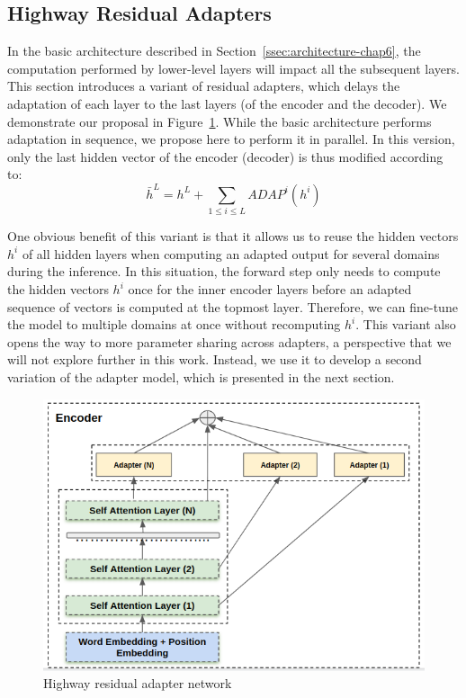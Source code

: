 \subsection{Highway Residual Adapters \label{ssec:highway-chap6}}

In the basic architecture described in Section~\ref{ssec:architecture-chap6}, the computation performed by lower-level layers will impact all the subsequent layers. This section introduces a variant of residual adapters, which delays the adaptation of each layer to the last layers (of the encoder and the decoder). We demonstrate our proposal in Figure~\ref{fig:hrl-architecture-chap6}. While the basic architecture performs adaptation in sequence, we propose here to perform it in parallel. In this version, only the last hidden vector of the encoder (decoder) is thus modified according to:
\begin{equation}
  \bar{h}^L = h^L + \displaystyle{\mathop{\sum}_{1 \leq i \leq L} ADAP^i(h^i)} \label{eq:highway-output-chap6}
\end{equation}

One obvious benefit of this variant is that it allows us to reuse the hidden vectors $h^i$ of all hidden layers when computing an adapted output for several domains during the inference. In this situation, the forward step only needs to compute the hidden vectors $h^i$ once for the inner encoder layers before an adapted sequence of vectors is computed at the topmost layer. Therefore, we can fine-tune the model to multiple domains at once without recomputing $h^i$. This variant also opens the way to more parameter sharing across adapters, a perspective that we will not explore further in this work. Instead, we use it to develop a second variation of the adapter model, which is presented in the next section.

\begin{figure}[htbp]
  \centering
  \includegraphics[scale=0.3]{graphics/highway_residual}
  \caption{Highway residual adapter network}
  \label{fig:hrl-architecture-chap6}
\end{figure}

